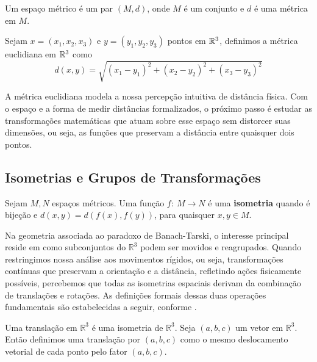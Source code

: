 \begin{definicao}
    \label{def:espaco_metrico}
    Um espaço métrico é um par \((M, d)\), onde \(M\) é um conjunto e \(d\) é uma métrica em \(M\).
\end{definicao}

\begin{exemplo}
    \label{ex:metrica_euclidiana_r3}
    Sejam \(x = (x_1, x_2, x_3)\) e \(y = (y_1, y_2, y_3)\) pontos em \(\mathbb{R}^3\), definimos a métrica euclidiana em \(\mathbb{R}^3\) como
    \[
        d(x,y) = \sqrt{(x_1 - y_1)^2 + (x_2 - y_2)^2 + (x_3 - y_3)^2}
    \]
\end{exemplo}

A métrica euclidiana modela a nossa percepção intuitiva de distância física. Com o espaço e a forma de medir distâncias formalizados, o próximo passo é estudar as transformações matemáticas que atuam sobre esse espaço sem distorcer suas dimensões, ou seja, as funções que preservam a distância entre quaisquer dois pontos.

\subsection{Isometrias e Grupos de Transformações}
\label{subsec:isometrias_grupos}

\begin{definicao}[Isometria]
    \label{def:isometria}
    Sejam \(M, N\) espaços métricos. Uma função \(f: \ M \to N \) é uma \textbf{isometria} quando é bijeção e \(d(x,y) = d(f(x), f(y))\), para quaisquer \(x,y \in M.\)
\end{definicao}





Na geometria associada ao paradoxo de Banach-Tarski, o interesse principal reside em como subconjuntos do \(\mathbb{R}^3\) podem ser movidos e reagrupados. Quando restringimos nossa análise aos movimentos rígidos, ou seja, transformações contínuas que preservam a orientação e a distância, refletindo ações fisicamente possíveis, percebemos que todas as isometrias espaciais derivam da combinação de translações e rotações. As definições formais dessas duas operações fundamentais são estabelecidas a seguir, conforme \textcite{zahoor2016}.

\begin{definicao}[Translação]
    \label{def:translacao}
    Uma translação em \(\mathbb{R}^3\) é uma isometria de \(\mathbb{R}^3\). Seja \((a,b,c)\) um vetor em \(\mathbb{R}^3\). Então definimos uma translação por \((a,b,c)\) como o mesmo deslocamento vetorial de cada ponto pelo fator \((a,b,c)\).
\end{definicao}

